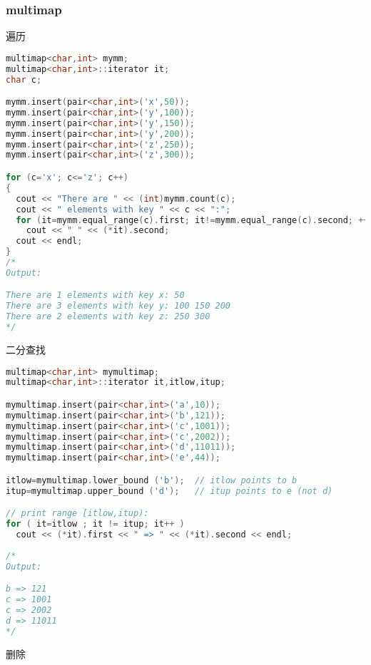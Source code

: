     \subsubsection{multimap}
	遍历\\
	\begin{lstlisting}[language=c++]
multimap<char,int> mymm;
multimap<char,int>::iterator it;
char c;

mymm.insert(pair<char,int>('x',50));
mymm.insert(pair<char,int>('y',100));
mymm.insert(pair<char,int>('y',150));
mymm.insert(pair<char,int>('y',200));
mymm.insert(pair<char,int>('z',250));
mymm.insert(pair<char,int>('z',300));

for (c='x'; c<='z'; c++)
{
  cout << "There are " << (int)mymm.count(c);
  cout << " elements with key " << c << ":";
  for (it=mymm.equal_range(c).first; it!=mymm.equal_range(c).second; ++it)
    cout << " " << (*it).second;
  cout << endl;
}
/*
Output:

There are 1 elements with key x: 50
There are 3 elements with key y: 100 150 200
There are 2 elements with key z: 250 300
*/
	\end{lstlisting}
	二分查找\\
	\begin{lstlisting}[language=c++]
multimap<char,int> mymultimap;
multimap<char,int>::iterator it,itlow,itup;

mymultimap.insert(pair<char,int>('a',10));
mymultimap.insert(pair<char,int>('b',121));
mymultimap.insert(pair<char,int>('c',1001));
mymultimap.insert(pair<char,int>('c',2002));
mymultimap.insert(pair<char,int>('d',11011));
mymultimap.insert(pair<char,int>('e',44));

itlow=mymultimap.lower_bound ('b');  // itlow points to b
itup=mymultimap.upper_bound ('d');   // itup points to e (not d)

// print range [itlow,itup):
for ( it=itlow ; it != itup; it++ )
  cout << (*it).first << " => " << (*it).second << endl;
  
/*
Output:

b => 121
c => 1001
c => 2002
d => 11011
*/
	\end{lstlisting}
	删除\\
